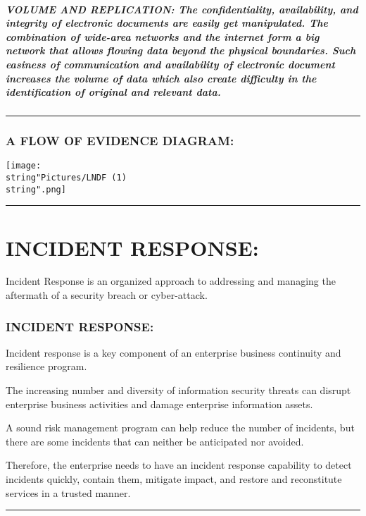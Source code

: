\documentclass[10pt,british,english]{article}
\begin{document}
\subsubsection{VOLUME AND REPLICATION: The confidentiality, availability, and integrity
of electronic documents are easily get manipulated. The combination
of wide-area networks and the internet form a big network that allows
flowing data beyond the physical boundaries. Such easiness of communication
and availability of electronic document increases the volume of data
which also create difficulty in the identification of original and
relevant data.}

\rule[0.5ex]{1\columnwidth}{1pt}

\section{A FLOW OF EVIDENCE DIAGRAM:}

\texttt{[image: \\string"Pictures/LNDF (1)\\string".png]}

\rule[0.5ex]{1\columnwidth}{1pt}

\part{INCIDENT RESPONSE: }

Incident Response is an organized approach to addressing and managing
the aftermath of a security breach or cyber-attack.

\section{INCIDENT RESPONSE:}

Incident response is a key component of an enterprise business continuity
and resilience program. 

The increasing number and diversity of information security threats
can disrupt enterprise business activities and damage enterprise information
assets. 

A sound risk management program can help reduce the number of incidents,
but there are some incidents that can neither be anticipated nor avoided. 

Therefore, the enterprise needs to have an incident response capability
to detect incidents quickly, contain them, mitigate impact, and restore
and reconstitute services in a trusted manner.

\rule[0.5ex]{1\columnwidth}{1pt}
\end{document}
